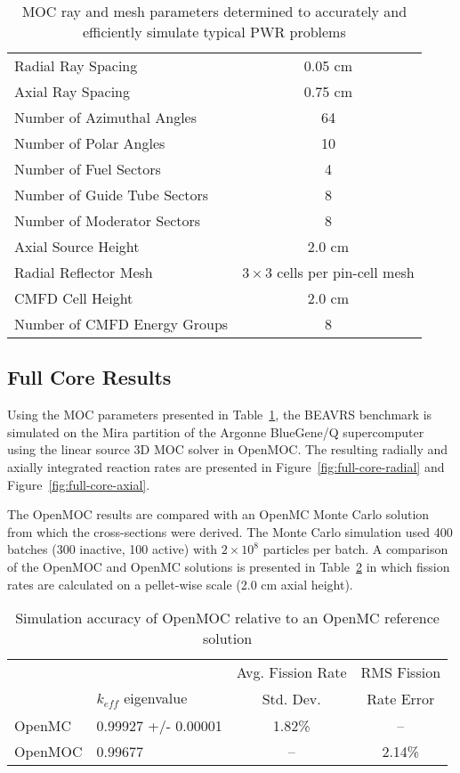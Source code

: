 \documentclass[12pt,twoside]{mitthesis-exec}
\begin{document}
\begin{table}[ht]
	\centering
	\caption{MOC ray and mesh parameters determined to accurately and efficiently simulate typical PWR problems}
	\medskip
	\begin{tabular}{lc}
		\hline
		Radial Ray Spacing & 0.05 cm \\
		Axial Ray Spacing & 0.75 cm \\
		Number of Azimuthal Angles & 64 \\
		Number of Polar Angles & 10 \\
		\hline
		Number of Fuel Sectors & 4 \\
		Number of Guide Tube Sectors & 8 \\
		Number of Moderator Sectors & 8 \\
		Axial Source Height & 2.0 cm \\
		Radial Reflector Mesh & $3\times 3$ cells per pin-cell mesh \\
		\hline
		CMFD Cell Height & 2.0 cm \\
		Number of CMFD Energy Groups & 8 \\
		\hline
	\end{tabular}
	\label{tab:final-params}
\end{table}

\newpage
\subsection*{Full Core Results}


Using the MOC parameters presented in Table~\ref{tab:final-params}, the BEAVRS benchmark is simulated on the Mira partition of the Argonne BlueGene/Q supercomputer using the linear source 3D MOC solver in OpenMOC. The resulting radially and axially integrated reaction rates are presented in Figure~\ref{fig:full-core-radial} and Figure~\ref{fig:full-core-axial}.

\newpage
The OpenMOC results are compared with an OpenMC Monte Carlo solution from which the cross-sections were derived. The Monte Carlo simulation used 400 batches (300 inactive, 100 active) with $2 \times 10^8$ particles per batch. A comparison of the OpenMOC and OpenMC solutions is presented in Table~\ref{tab:openmc-comparison} in which fission rates are calculated on a pellet-wise scale (2.0 cm axial height).

\begin{table}[ht]
	\centering
	\caption{Simulation accuracy of OpenMOC relative to an OpenMC reference solution}
	\medskip
	\begin{tabular}{l|l|c|c}
		&                               & Avg. Fission Rate & RMS Fission \\
		& $k_{\textit{eff}}$ eigenvalue & Std. Dev.         & Rate Error \\
		\hline
		OpenMC  & 0.99927 +/- 0.00001  & 1.82\% & --     \\
		OpenMOC & 0.99677                         & --     & 2.14\% \\
		\hline
	\end{tabular}
	\label{tab:openmc-comparison}
\end{table}
\end{document}
